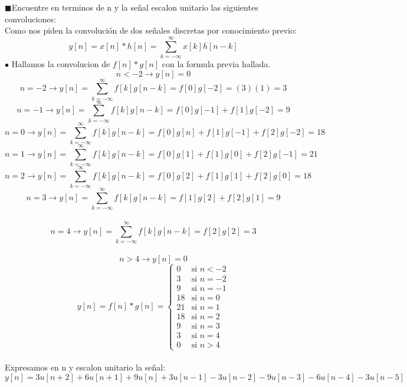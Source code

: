 \documentclass[10pt,a4paper]{article}
\begin{document}
\begin{center}
\begin{enumerate}
$ \blacksquare$Encuentre en terminos de n y la señal escalon unitario las siguientes convoluciones:\\
Como nos piden la convoluci\'on de dos señales discretas por conocimiento previo:
$$\boxed{y[n]=x[n]*h[n]=\sum_{k=-\infty}^{\infty}x[k]h[n-k]}$$
$\bullet$ Hallamos la convolucion de $f[n]*g[n]$ con la formula previa hallada.
$$n<-2 \rightarrow y[n]=0$$
$$n=-2 \rightarrow y[n]=\sum_{k=-\infty}^{\infty}f[k]g[n-k]=f[0]g[-2]=(3)(1)=3$$
$$n=-1 \rightarrow y[n]=\sum_{k=-\infty}^{\infty}f[k]g[n-k]=f[0]g[-1]+f[1]g[-2]=9$$
$$n=0 \rightarrow y[n]=\sum_{k=-\infty}^{\infty}f[k]g[n-k]=f[0]g[n]+f[1]g[-1]+f[2]g[-2]=18$$
$$n=1 \rightarrow y[n]=\sum_{k=-\infty}^{\infty}f[k]g[n-k]=f[0]g[1]+f[1]g[0]+f[2]g[-1]=21$$
$$n=2 \rightarrow y[n]=\sum_{k=-\infty}^{\infty}f[k]g[n-k]=f[0]g[2]+f[1]g[1]+f[2]g[0]=18$$
$$n=3 \rightarrow y[n]=\sum_{k=-\infty}^{\infty}f[k]g[n-k]=f[1]g[2]+f[2]g[1]=9$$\\
$$n=4 \rightarrow y[n]=\sum_{k=-\infty}^{\infty}f[k]g[n-k]=f[2]g[2]=3$$\\
$$n>4 \rightarrow y[n]=0$$
\begin{equation*}
y[n]=f[n]*g[n] =
\begin{cases}
0 & \text{si $n<-2 $}\\
3 & \text{si $n= -2$}\\
9 & \text{si $n= -1$}\\
18 & \text{si $n= 0$}\\
21 & \text{si $n= 1$}\\
18 & \text{si $n= 2$}\\
9 & \text{si $n= 3$}\\
3 & \text{si $n=4$}\\
0 & \text{si $n>4$}
\end{cases}
\end{equation*}\\
Expresamos en n y escalon unitario la señal:
$$\boxed{y[n]=3u[n+2]+6u[n+1]+9u[n]+3u[n-1]-3u[n-2]-9u[n-3]-6u[n-4]-3u[n-5]}$$


\end{enumerate}
\end{center}
\end{document}
